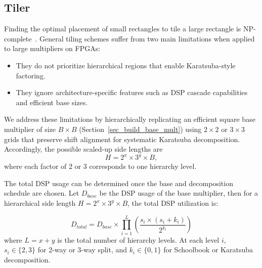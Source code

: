 \documentclass[sigconf,9pt,review]{acmart}
\begin{document}
% 
\subsection{Tiler} \label{sec_tiler}
Finding the optimal placement of small rectangles to tile a large rectangle is NP-complete~\cite{BeumontTilingNPComplete2002}.
General tiling schemes suffer from two main limitations when applied to large multipliers on FPGAs:
\begin{itemize}
    \item They do not prioritize hierarchical regions that enable Karatsuba-style factoring.
    \item They ignore architecture-specific features such as DSP cascade capabilities and efficient base sizes.
\end{itemize}

We address these limitations by hierarchically replicating an efficient square base multiplier of size $B\times B$ (Section~\ref{sec_build_base_mult}) using $2\times2$ or $3\times3$ grids that preserve shift alignment for systematic Karatsuba decomposition.
Accordingly, the possible scaled-up side lengths are
\[
H = 2^x \times 3^y \times B,
\]
where each factor of $2$ or $3$ corresponds to one hierarchy level.




The total DSP usage can be determined once the base and decomposition schedule are chosen.
Let $D_{\mathit{base}}$ be the DSP usage of the base multiplier, then
for a hierarchical side length $H=2^x\times 3^y\times B$, the total DSP utilization is:

\begin{equation*}
D_{\mathit{total}} = D_{\mathit{base}} \times \prod_{i=1}^{L} (\frac{s_i \times (s_i + k_i)}{2^{k_i}})
\end{equation*}
where $L=x+y$ is the total number of hierarchy levels. At each level $i$, $s_i\in\{2,3\}$ for 2-way or 3-way split, and $k_i\in\{0,1\}$ for Schoolbook or Karatsuba decomposition.
\end{document}
